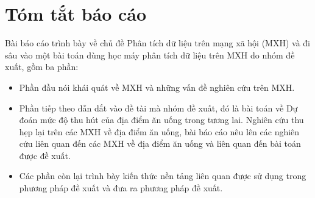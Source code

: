 \documentclass[12pt]{extarticle}
\begin{document}


	\newpage
	\thispagestyle{empty}
	\tableofcontents
	\newpage
	\listoffigures
	\newpage
	\listoftables
	\newpage
	\section{Tóm tắt báo cáo}	
		\par Bài báo cáo trình bày về chủ đề Phân tích dữ liệu trên mạng xã hội (MXH) và đi sâu vào một bài toán dùng học máy phân tích dữ liệu trên MXH do nhóm đề xuất, gồm ba phần:
		\begin{itemize}

		\item{Phần đầu nói khái quát về MXH và những vấn đề nghiên cứu trên MXH.}	

		\item{Phần tiếp theo dẫn dắt vào đề tài mà nhóm đề xuất, đó là bài toán về Dự đoán mức độ thu hút của địa điểm ăn uống trong tương lai. Nghiên cứu thu hẹp lại trên các MXH về địa điểm ăn uống, bài báo cáo nêu lên các nghiên cứu liên quan đến các MXH về địa điểm ăn uống và liên quan đến bài toán được đề xuất.}

		\item{Các phần còn lại trình bày kiến thức nền tảng liên quan được sử dụng trong phương pháp đề xuất và đưa ra phương pháp đề xuất.}


		\end{itemize}
\end{document}
